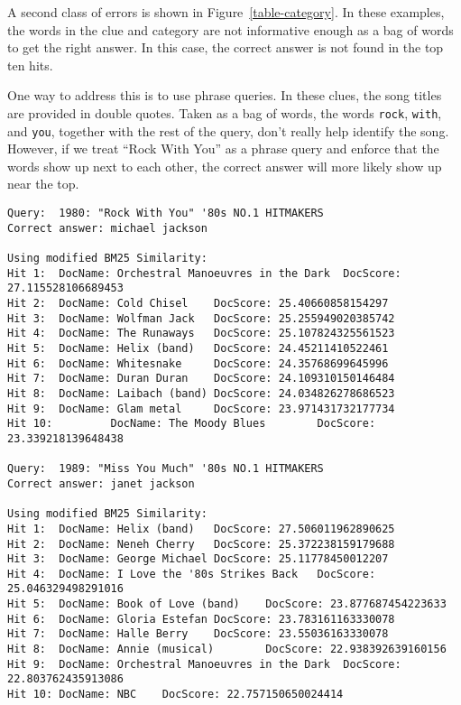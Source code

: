 \documentclass[11pt,letterpaper]{article}
\begin{document}
A second class of errors is shown in Figure~\ref{table-category}. In these examples, the words in the clue and category are not informative enough as a bag of words to get the right answer.
In this case, the correct answer is not found in the top ten hits.

One way to address this is to use phrase queries.
In these clues, the song titles are provided in double quotes.
Taken as a bag of words, the words \texttt{rock}, \texttt{with}, and \texttt{you}, together with the rest of the query, don't really help identify the song.
However, if we treat ``Rock With You'' as a phrase query and enforce that the words show up next to each other, the correct answer will more likely show up near the top.




\begin{figure*}[tb]
	\small
\begin{verbatim}
Query:  1980: "Rock With You" '80s NO.1 HITMAKERS
Correct answer: michael jackson

Using modified BM25 Similarity:
Hit 1:  DocName: Orchestral Manoeuvres in the Dark  DocScore: 27.115528106689453
Hit 2:  DocName: Cold Chisel    DocScore: 25.40660858154297
Hit 3:  DocName: Wolfman Jack   DocScore: 25.255949020385742
Hit 4:  DocName: The Runaways   DocScore: 25.107824325561523
Hit 5:  DocName: Helix (band)   DocScore: 24.45211410522461
Hit 6:  DocName: Whitesnake     DocScore: 24.35768699645996
Hit 7:  DocName: Duran Duran    DocScore: 24.109310150146484
Hit 8:  DocName: Laibach (band) DocScore: 24.034826278686523
Hit 9:  DocName: Glam metal     DocScore: 23.971431732177734
Hit 10:         DocName: The Moody Blues        DocScore: 23.339218139648438

Query:  1989: "Miss You Much" '80s NO.1 HITMAKERS
Correct answer: janet jackson

Using modified BM25 Similarity:
Hit 1:  DocName: Helix (band)   DocScore: 27.506011962890625
Hit 2:  DocName: Neneh Cherry   DocScore: 25.372238159179688
Hit 3:  DocName: George Michael DocScore: 25.11778450012207
Hit 4:  DocName: I Love the '80s Strikes Back   DocScore: 25.046329498291016
Hit 5:  DocName: Book of Love (band)    DocScore: 23.877687454223633
Hit 6:  DocName: Gloria Estefan DocScore: 23.783161163330078
Hit 7:  DocName: Halle Berry    DocScore: 23.55036163330078
Hit 8:  DocName: Annie (musical)        DocScore: 22.938392639160156
Hit 9:  DocName: Orchestral Manoeuvres in the Dark  DocScore: 22.803762435913086
Hit 10: DocName: NBC    DocScore: 22.757150650024414
\end{verbatim}
\normalsize
\caption{Examples of where the words in the clue and category are not informative enough to get the right answer. Could possible be solved with phrase queries using the song title given in the clue.}
\label{table-category}
\end{figure*}
\end{document}
